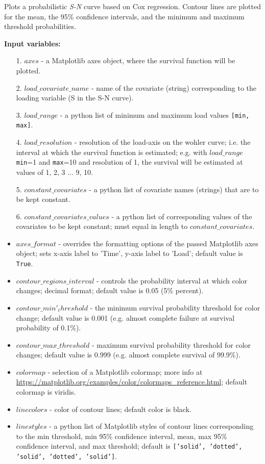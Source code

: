 \documentclass[twoside,a4paper]{refart}
\begin{document}
Plots a probabilistic \textit{S-N} curve based on Cox regression. Contour lines are plotted for the mean, the 95\% confidence intervals, and the minimum and maximum threshold probabilities.

\textbf{Input variables:}
\begin{itemize}
    \item[1.] $axes$ - a Matplotlib axes object, where the survival function will be plotted.
    \item[2.] $load\_covariate\_name$ - name of the covariate (string) corresponding to the loading variable (S in the S-N curve).
    \item[3.] $load\_range$ - a python list of minimum and maximum load values \texttt{[min, max]}.
    \item[4.] $load\_resolution$ - resolution of the load-axis on the wohler curve; i.e. the interval at which the survival function is estimated; e.g. with $load\_range$ \texttt{min}=1 and \texttt{max}=10 and resolution of 1, the survival will be estimated at values of 1, 2, 3 ... 9, 10.
    \item[5.] $constant\_covariates$ - a python list of covariate names (strings) that are to be kept constant.
    \item[6.] $constant\_covariates\_values$ - a python list of corresponding values of the covariates to be kept constant; must equal in length to $constant\_covariates$.
    \item $axes\_format$ - overrides the formatting options of the passed Matplotlib axes object; sets x-axis label to 'Time', y-axis label to 'Load'; default value is \texttt{True}.
    \item $contour\_regions\_interval$ - controls the probability interval at which color changes; decimal format; default value is 0.05 (5\% percent).
    \item $contour\_min'_threshold$ - the minimum survival probability threshold for color change; default value is 0.001 (e.g. almost complete failure at survival probability of 0.1\%).
    \item $contour\_max\_threshold$ - maximum survival probability threshold for color changes; default value is 0.999 (e.g. almost complete survival of 99.9\%).
    \item $colormap$ - selection of a Matplotlib colormap; more info at \url{https://matplotlib.org/examples/color/colormaps_reference.html}; default colormap is viridis.
    \item $linecolors$ -  color of contour lines; default color is black.
    \item $linestyles$ - a python list of Matplotlib styles of contour lines corresponding to the min threshold, min 95\% confidence interval, mean, max 95\% confidence interval, and max threshold; default is \texttt{['solid', 'dotted', 'solid', 'dotted', 'solid']}.
\end{itemize}
\end{document}
